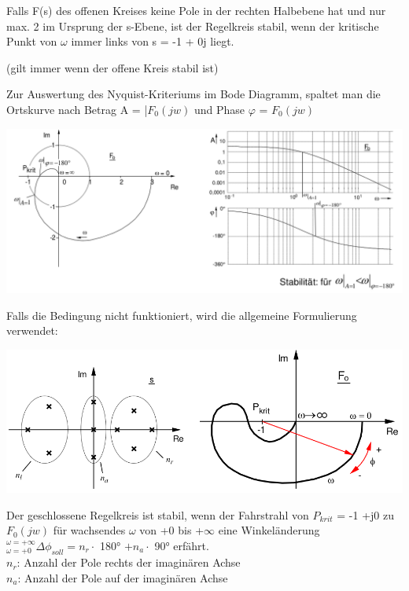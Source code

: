 \documentclass[10pt,a4paper]{article}
\begin{document}
\begin{mdframed}[style=exercise]
	Falls F(s) des offenen Kreises keine Pole in der rechten Halbebene hat und
	nur max. 2 im Ursprung der s-Ebene, ist der Regelkreis stabil, wenn der
	kritische Punkt von $\omega$ immer links von s = -1 + 0j liegt.

	\footnotesize
	(gilt immer wenn der offene Kreis stabil ist)
\end{mdframed}

Zur Auswertung des Nyquist-Kriteriums im Bode Diagramm, spaltet man die Ortskurve nach Betrag
A = |$F_0 (jw)$ und Phase $\varphi$ = $F_0(jw)$

\includegraphics[width=0.94\columnwidth]{Figures/Nyquist_Bode.png}

Falls die Bedingung nicht funktioniert, wird die allgemeine Formulierung verwendet:

\includegraphics[width=0.94\columnwidth]{Figures/Allgemein_Nyquist.png}

\begin{mdframed}[style=exercise]
	Der geschlossene Regelkreis ist stabil, wenn der Fahrstrahl von $P_{krit}$ = -1 +j0
	zu $F_0 (jw)$ für wachsendes $\omega$ von +0 bis +$\infty$ eine Winkeländerung
	$^{\omega=+\infty}_{\omega=+0} \Delta \phi _{soll} = n_r \cdot$ 180° $+n_a \cdot$ 90°
	erfährt.\\
	$n_r$: Anzahl der Pole rechts der imaginären Achse\\
	$n_a$: Anzahl der Pole auf der imaginären Achse
\end{mdframed}
\end{document}
